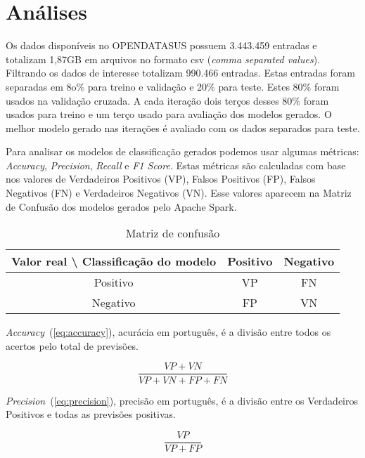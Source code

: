 \chapter{Análises}
\label{ch:analises}

Os dados disponíveis no OPENDATASUS possuem 3.443.459 entradas e totalizam 1,87GB em arquivos no formato csv (\textit{comma separated values}).
Filtrando os dados de interesse totalizam 990.466 entradas.
Estas entradas foram separadas em 8o\% para treino e validação e 20\% para teste.
Estes 80\% foram usados na validação cruzada.
A cada iteração dois terços desses 80\% foram usados para treino e um terço usado para avaliação dos modelos gerados.
O melhor modelo gerado nas iterações é avaliado com os dados separados para teste.

Para analisar os modelos de classificação gerados podemos usar algumas métricas: \textit{Accuracy}, \textit{Precision}, \textit{Recall} e \textit{F1 Score}.
Estas métricas são calculadas com base nos valores de Verdadeiros Positivos (VP), Falsos Positivos (FP), Falsos Negativos (FN) e Verdadeiros Negativos (VN).
Esse valores aparecem na Matriz de Confusão dos modelos gerados pelo Apache Spark.

\begin{table}[h]
    \centering
    \begin{tabular}{|c|c|c|}
        \hline
        Valor real \textbackslash{} Classificação do modelo & Positivo & Negativo \\ \hline
        Positivo                                            & VP       & FN       \\ \hline
        Negativo                                            & FP       & VN       \\ \hline
    \end{tabular}
    \caption{Matriz de confusão}
    \label{tab:matriz-confusao}
\end{table}

\textit{Accuracy}~(\ref{eq:accuracy}), acurácia em português, é a divisão entre todos os acertos pelo total de previsões.

\begin{equation}
    \label{eq:accuracy}
    \frac{VP + VN}{VP + VN + FP + FN}
\end{equation}

\textit{Precision}~(\ref{eq:precision}), precisão em português, é a divisão entre os Verdadeiros Positivos e todas as previsões positivas.

\begin{equation}
    \label{eq:precision}
    \frac{VP}{VP + FP}
\end{equation}

